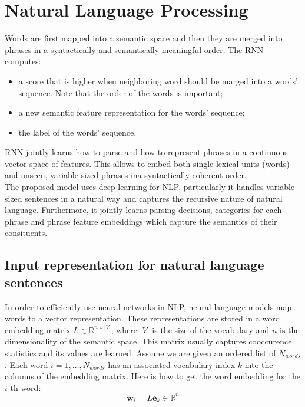 \section{Natural Language Processing}

Words are first mapped into a semantic space and then they are merged into
phrases in a syntactically and semantically meaningful order.
The RNN computes:
\begin{itemize}
	\item a score that is higher when neighboring word should be marged into
		a words' sequence. Note that the order of the words is important;

	\item a new semantic feature representation for the words' sequence;

	\item the label of the words' sequence.
\end{itemize}

RNN jointly learns how to parse and how to represent phrases in a continuous
vector space of features. This allows to embed both single lexical units (words)
and unseen, variable-sized phrases ina syntactically coherent order.\\

The proposed model uses deep learning for NLP, particularly it handles variable
sized sentences in a natural way and captures the recursive nature of natural
language. Furthermore, it jointly learns parsing decisions, categories for each
phrase and phrase feature embeddings which capture the semantics of their
consituents.

\subsection{Input representation for natural language sentences}

In order to efficiently use neural networks in NLP, neural language models map
words to a vector representation. These representations are stored in a word
embedding matrix $L \in \mathbb{R}^{n \times |V|}$, where $|V|$ is the size of
the vocabulary and $n$ is the dimensionality of the semantic space.
This matrix usually captures cooccurence statistics and its values are learned.
Assume we are given an ordered list of $N_{words}$. Each word $i = 1, \dots,
N_{words}$ has an associated vocabulary index $k$ into the columns of the
embedding matrix. Here is how to get the word embedding for the $i$-th word:
\begin{equation}
	\mathbf{w}_i = L \mathbf{e}_k \in \mathbb{R}^n
\end{equation}
